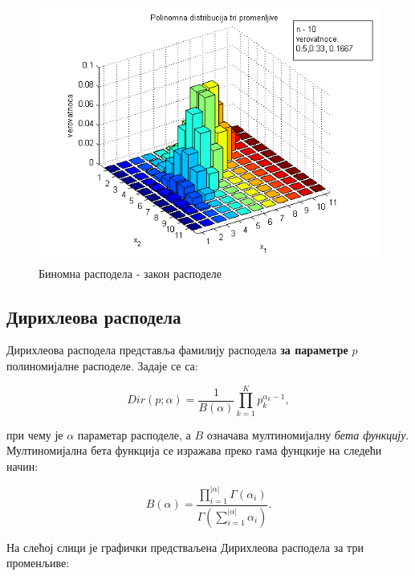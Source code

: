 \begin{figure}[H]
    \centering
\captionsetup{justification=centering}
   \includegraphics[scale=0.8]{./Slike/slika29.png} 
	\caption{Биномна расподела - закон расподеле} 
	\label{fig:slika20}
\end{figure}




\subsection{Дирихлеова расподела}

Дирихлеова расподела представља фамилију расподела \textbf{за параметре} $p$ полиномијалне расподеле. Задаје се са:

$$
Dir(p;\alpha) = \frac{1}{B(\alpha)}\prod_{k=1}^{K}p_k^{\alpha_k -1},
$$

при чему је $\alpha$ параметар расподеле, а $B$ означава мултиномијалну \textit{бета функцију}. 
Мултиномијална бета функција се изражава преко гама фунцкије на следећи начин:

$$B(\alpha) = \frac{\prod_{i=1}^{|\alpha|}\Gamma(\alpha_i)}{\Gamma(\sum_{i=1}^{|\alpha|}\alpha_i)}.$$


На слећој слици је графички предстваљена Дирихлеова расподела за три променљиве:

